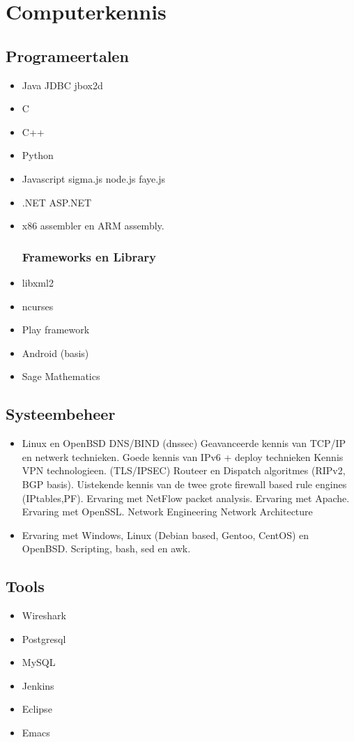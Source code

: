 \documentclass{tccv}
\begin{document}
\section{Computerkennis}
\subsection{Programeertalen}
\begin{itemize}
\item Java
\subitem JDBC
\subitem jbox2d
\subitem 
\item C
\item C++
\item Python
\item Javascript
\subitem sigma.js
\subitem node.js
\subitem faye.js
\item .NET
\subitem ASP.NET
\item x86 assembler en ARM assembly.
\subsubsection*{Frameworks en Library}
\item libxml2
\item ncurses
\item Play framework
\item Android (basis)
\item Sage Mathematics
\end{itemize}
\subsection{Systeembeheer}
\begin{itemize}
\item Linux en OpenBSD
\subitem DNS/BIND (dnssec)
\subitem Geavanceerde kennis van TCP/IP en netwerk technieken.
\subitem Goede kennis van IPv6 + deploy technieken
\subitem Kennis VPN technologieen. (TLS/IPSEC)
\subitem Routeer en Dispatch algoritmes (RIPv2, BGP basis).
\subitem Uistekende kennis van de twee grote firewall based rule engines (IPtables,PF).
\subitem Ervaring met NetFlow packet analysis.
\subitem Ervaring met Apache.
\subitem Ervaring met OpenSSL.
\subitem Network Engineering
\subitem Network Architecture
\item Ervaring met Windows, Linux (Debian based, Gentoo, CentOS) en OpenBSD.
\subitem Scripting, bash, sed en awk.
\end{itemize}
\subsection*{Tools}
\begin{itemize}
\item Wireshark
\item Postgresql
\item MySQL
\item Jenkins
\item Eclipse
\item Emacs
\end{itemize}
\end{document}
